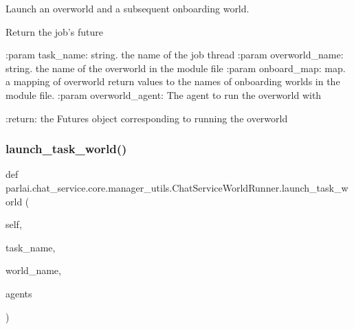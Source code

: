 \begin{DoxyVerb}Launch an overworld and a subsequent onboarding world.

Return the job's future

:param task_name:
    string. the name of the job thread
:param overworld_name:
    string. the name of the overworld in the module file
:param onboard_map:
    map. a mapping of overworld return values to the names
    of onboarding worlds in the module file.
:param overworld_agent:
    The agent to run the overworld with

:return:
    the Futures object corresponding to running the overworld
\end{DoxyVerb}
 \mbox{\label{classparlai_1_1chat__service_1_1core_1_1manager__utils_1_1ChatServiceWorldRunner_ac6b8bd46cafa3ce7a5a74f4c1c35b8a8}} 
\subsubsection{\texorpdfstring{launch\+\_\+task\+\_\+world()}{launch\_task\_world()}}
{\footnotesize\ttfamily def parlai.\+chat\+\_\+service.\+core.\+manager\+\_\+utils.\+Chat\+Service\+World\+Runner.\+launch\+\_\+task\+\_\+world (\begin{DoxyParamCaption}\item[{}]{self,  }\item[{}]{task\+\_\+name,  }\item[{}]{world\+\_\+name,  }\item[{}]{agents }\end{DoxyParamCaption})}

